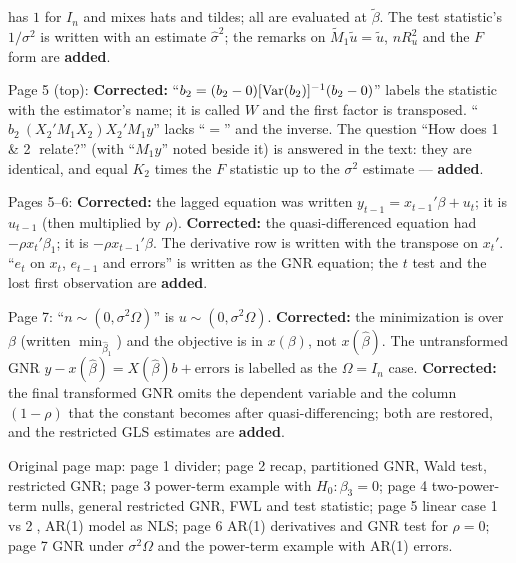 \documentclass[11pt]{article}
\begin{document}
\begin{transcriptnotes}
       has $1$ for $I_{n}$ and mixes hats and tildes; all are evaluated at $\tilde\beta$.
       The test statistic's $1/\sigma^{2}$ is written with an estimate $\hat\sigma^{2}$;
       the remarks on $\tilde M_{1}\tilde u=\tilde u$, $nR^{2}_{u}$ and the $F$ form are
       \textbf{added}.
 \item Page 5 (top): \textbf{Corrected:} ``$b_{2}=(b_{2}-0)[\operatorname{Var}(b_{2})]^{-1}(b_{2}-0)$''
       labels the statistic with the estimator's name; it is called $W$ and the first
       factor is transposed. ``$b_{2}\ (X_{2}'M_{1}X_{2})X_{2}'M_{1}y$'' lacks ``$=$'' and
       the inverse. The question ``How does \textcircled{\scriptsize 1} \&
       \textcircled{\scriptsize 2} relate?'' (with ``$M_{1}y$'' noted beside it) is
       answered in the text: they are identical, and equal $K_{2}$ times the $F$
       statistic up to the $\sigma^{2}$ estimate --- \textbf{added}.
 \item Pages 5--6: \textbf{Corrected:} the lagged equation was written
       $y_{t-1}=x_{t-1}'\beta+u_{t}$; it is $u_{t-1}$ (then multiplied by $\rho$).
       \textbf{Corrected:} the quasi-differenced equation had $-\rho x_{t}'\beta_{1}$;
       it is $-\rho x_{t-1}'\beta$. The derivative row is written with the transpose
       on $x_{t}'$. ``$e_{t}$ on $x_{t}$, $e_{t-1}$ and errors'' is written as the GNR
       equation; the $t$ test and the lost first observation are \textbf{added}.
 \item Page 7: ``$n\sim(0,\sigma^{2}\Omega)$'' is $u\sim(0,\sigma^{2}\Omega)$.
       \textbf{Corrected:} the minimization is over $\beta$ (written $\min_{\hat\beta_{1}}$)
       and the objective is in $x(\beta)$, not $x(\hat\beta)$. The untransformed GNR
       $y-x(\hat\beta)=X(\hat\beta)b+\text{errors}$ is labelled as the $\Omega=I_{n}$
       case. \textbf{Corrected:} the final transformed GNR omits the dependent
       variable and the column $(1-\rho)$ that the constant becomes after
       quasi-differencing; both are restored, and the restricted GLS estimates are
       \textbf{added}.
 \item Original page map: page 1 divider; page 2 recap, partitioned GNR, Wald test,
       restricted GNR; page 3 power-term example with $H_{0}:\beta_{3}=0$; page 4
       two-power-term nulls, general restricted GNR, FWL and test statistic; page 5
       linear case \textcircled{\scriptsize 1} vs \textcircled{\scriptsize 2}, AR(1)
       model as NLS; page 6 AR(1) derivatives and GNR test for $\rho=0$; page 7 GNR
       under $\sigma^{2}\Omega$ and the power-term example with AR(1) errors.
\end{transcriptnotes}
\end{document}
